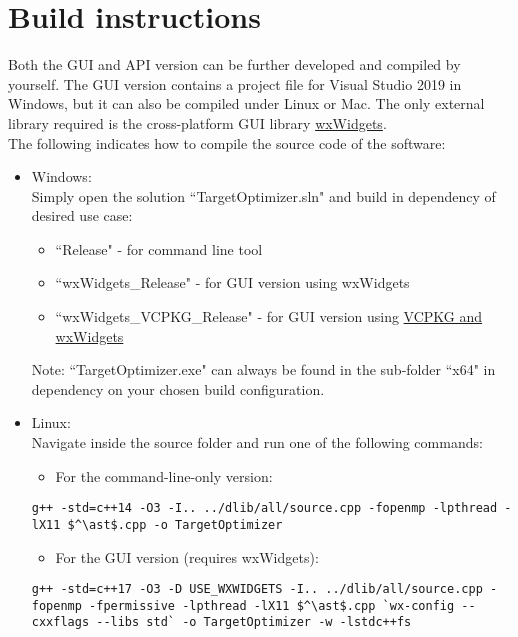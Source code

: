 \section{Build instructions}\label{sec:build}
Both the GUI and API version can be further developed and compiled by yourself. The GUI version contains a project file for Visual Studio 2019 in Windows, but it can also be compiled under Linux or Mac. The only external library required is the cross-platform GUI library   \href{www.wxwidgets.org}{wxWidgets}.\\ 
The following indicates how to compile the source code of the software:
\begin{itemize}
	\item Windows: \\
	Simply open the solution ``TargetOptimizer.sln" and build in dependency of desired use case:
	\begin{itemize}
		\item ``Release" - for command line tool				
		\item ``wxWidgets\_Release" - for GUI version using wxWidgets
		\item ``wxWidgets\_VCPKG\_Release" - for GUI version using   \href{https://www.wxwidgets.org/blog/2019/01/wxwidgets-and-vcpkg/}{VCPKG and wxWidgets} 
	\end{itemize}
	Note: ``TargetOptimizer.exe" can always be found in the sub-folder ``x64" in dependency on your chosen build configuration.
	\item Linux: \\
	Navigate inside the source folder and run one of the following commands:
	\begin{itemize}
		\item For the command-line-only version:
	\end{itemize}
	\begin{lstlisting}[mathescape=true]
	g++ -std=c++14 -O3 -I.. ../dlib/all/source.cpp -fopenmp -lpthread -lX11 $^\ast$.cpp -o TargetOptimizer
	\end{lstlisting}
	\begin{itemize}
	    \item For the GUI version (requires wxWidgets):
	\end{itemize}
	\begin{lstlisting}[mathescape=true]
	g++ -std=c++17 -O3 -D USE_WXWIDGETS -I.. ../dlib/all/source.cpp -fopenmp -fpermissive -lpthread -lX11 $^\ast$.cpp `wx-config --cxxflags --libs std` -o TargetOptimizer -w -lstdc++fs
	\end{lstlisting}
\end{itemize}

